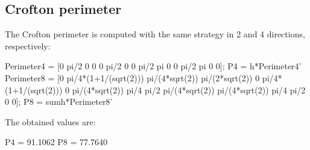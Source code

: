 \subsection{Crofton perimeter}
The Crofton perimeter is computed with the same strategy in 2 and 4 directions, respectively:
\begin{matlab}
Perimeter4 = [0 pi/2 0 0 0 pi/2 0 0 pi/2 pi 0 0 pi/2 pi 0 0];
P4 = h*Perimeter4'
Perimeter8 = [0 pi/4*(1+1/(sqrt(2))) pi/(4*sqrt(2)) pi/(2*sqrt(2)) 0 pi/4*(1+1/(sqrt(2))) 0 pi/(4*sqrt(2)) pi/4 pi/2 pi/(4*sqrt(2)) pi/(4*sqrt(2)) pi/4 pi/2 0 0];
P8 = sumh*Perimeter8'
\end{matlab}
The obtained values are:
\begin{mwindow}
P4 =   91.1062
P8 =   77.7640
\end{mwindow}

